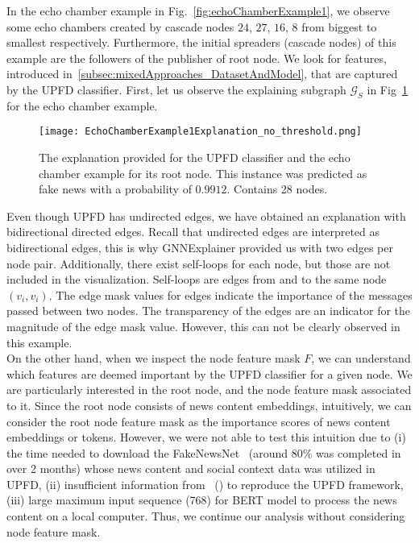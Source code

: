 In the echo chamber example in Fig.~\ref{fig:echoChamberExample1}, we observe some echo chambers created by cascade nodes $24$, $27$, $16$, $8$ from biggest to smallest respectively. Furthermore, the initial spreaders (cascade nodes) of this example are the followers of the publisher of root node. We look for features, introduced in~\ref{subsec:mixedApproaches_DatasetAndModel}, that are captured by the UPFD classifier. First, let us observe the explaining subgraph $\mathcal{G}_S$ in Fig~\ref{fig:EchoChamberExample1Explanation_no_threshold} for the echo chamber example.\\
\begin{figure}
    \centering
    \texttt{[image: EchoChamberExample1Explanation\_no\_threshold.png]}
    \caption[Echo chamber example explanation for root node]{The explanation provided for the UPFD classifier and the echo chamber example for its root node. This instance was predicted as fake news with a probability of $0.9912$. Contains 28 nodes.}
    \label{fig:EchoChamberExample1Explanation_no_threshold}
\end{figure}
Even though UPFD has undirected edges, we have obtained an explanation with bidirectional directed edges. Recall that undirected edges are interpreted as bidirectional edges, this is why GNNExplainer provided us with two edges per node pair. Additionally, there exist self-loops for each node, but those are not included in the visualization. Self-loops are edges from and to the same node $(v_i, v_i)$. The edge mask values for edges indicate the importance of the messages passed between two nodes. The transparency of the edges are an indicator for the magnitude of the edge mask value. However, this can not be clearly observed in this example.\\
On the other hand, when we inspect the node feature mask $F$, we can understand which features are deemed important by the UPFD classifier for a given node. We are particularly interested in the root node, and the node feature mask associated to it. Since the root node consists of news content embeddings, intuitively, we can consider the root node feature mask as the importance scores of news content embeddings or tokens. However, we were not able to test this intuition due to (i) the time needed to download the FakeNewsNet~\parencite{FakeNewsNet_Shu} (around 80\% was completed in over 2 months) whose news content and social context data was utilized in UPFD, (ii) insufficient information from~\citeauthor{UPFD_Dataset_Shu} (\citeyear{UPFD_Dataset_Shu}) to reproduce the UPFD framework, (iii) large maximum input sequence (768) for BERT model to process the news content on a local computer. Thus, we continue our analysis without considering node feature mask. \\
